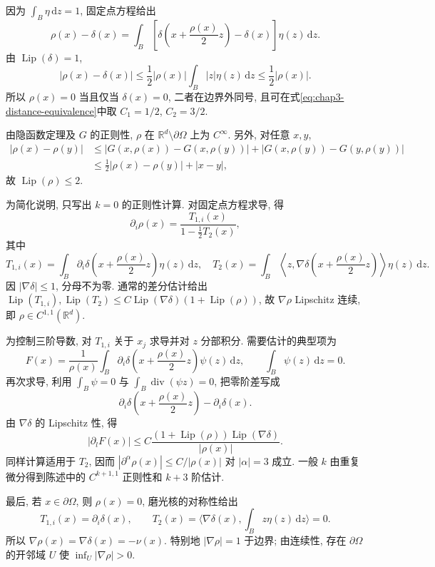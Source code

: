 \begin{Proof}
因为 $\int_B\eta\,\mathrm dz=1$, 固定点方程给出
\[
 \rho(x)-\delta(x)=\int_B\left[\delta\left(x+\frac{\rho(x)}2z\right)-\delta(x)\right]\eta(z)\,\mathrm dz.
\]
由 $\operatorname{Lip}(\delta)=1$,
\[
 |\rho(x)-\delta(x)|\leq\frac12|\rho(x)|
 \int_B|z|\eta(z)\,\mathrm dz\leq\frac12|\rho(x)|.
\]
所以 $\rho(x)=0$ 当且仅当 $\delta(x)=0$, 二者在边界外同号, 且可在式\eqref{eq:chap3-distance-equivalence}中取 $C_1=1/2$, $C_2=3/2$.

由隐函数定理及 $G$ 的正则性, $\rho$ 在 $\mathbb R^d\setminus\partial\Omega$ 上为 $C^\infty$. 另外, 对任意 $x,y$,
\begin{align*}
 |\rho(x)-\rho(y)|
 &\leq|G(x,\rho(x))-G(x,\rho(y))|
 +|G(x,\rho(y))-G(y,\rho(y))|\\
 &\leq\frac12|\rho(x)-\rho(y)|+|x-y|,
\end{align*}
故 $\operatorname{Lip}(\rho)\leq2$.

为简化说明, 只写出 $k=0$ 的正则性计算. 对固定点方程求导, 得
\[
 \partial_i\rho(x)=\frac{T_{1,i}(x)}{1-\frac12T_2(x)},
\]
其中
\[
 T_{1,i}(x)=\int_B\partial_i\delta\left(x+\frac{\rho(x)}2z\right)\eta(z)\,\mathrm dz,
 \quad
 T_2(x)=\int_B\left\langle z,\nabla\delta\left(x+\frac{\rho(x)}2z\right)\right\rangle\eta(z)\,\mathrm dz.
\]
因 $|\nabla\delta|\leq1$, 分母不为零. 通常的差分估计给出 $\operatorname{Lip}(T_{1,i}),\operatorname{Lip}(T_2)\leq C\operatorname{Lip}(\nabla\delta)(1+\operatorname{Lip}(\rho))$, 故 $\nabla\rho$ Lipschitz 连续, 即 $\rho\in C^{1,1}(\mathbb R^d)$.

为控制三阶导数, 对 $T_{1,i}$ 关于 $x_j$ 求导并对 $z$ 分部积分. 需要估计的典型项为
\[
 F(x)=\frac1{\rho(x)}\int_B
 \partial_i\delta\left(x+\frac{\rho(x)}2z\right)\psi(z)\,\mathrm dz,
 \qquad\int_B\psi(z)\,\mathrm dz=0.
\]
再次求导, 利用 $\int_B\psi=0$ 与 $\int_B\operatorname{div}(\psi z)=0$, 把零阶差写成
\[
 \partial_i\delta\left(x+\frac{\rho(x)}2z\right)-\partial_i\delta(x).
\]
由 $\nabla\delta$ 的 Lipschitz 性, 得
\[
 |\partial_lF(x)|\leq
 C\frac{(1+\operatorname{Lip}(\rho))\operatorname{Lip}(\nabla\delta)}{|\rho(x)|}.
\]
同样计算适用于 $T_2$, 因而 $|\partial^\alpha\rho(x)|\leq C/|\rho(x)|$ 对 $|\alpha|=3$ 成立. 一般 $k$ 由重复微分得到陈述中的 $C^{k+1,1}$ 正则性和 $k+3$ 阶估计.

最后, 若 $x\in\partial\Omega$, 则 $\rho(x)=0$, 磨光核的对称性给出
\[
 T_{1,i}(x)=\partial_i\delta(x),
 \qquad T_2(x)=\langle\nabla\delta(x),\int_Bz\eta(z)\,\mathrm dz\rangle=0.
\]
所以 $\nabla\rho(x)=\nabla\delta(x)=-\nu(x)$. 特别地 $|\nabla\rho|=1$ 于边界; 由连续性, 存在 $\partial\Omega$ 的开邻域 $U$ 使 $\inf_U|\nabla\rho|>0$.
\end{Proof}

